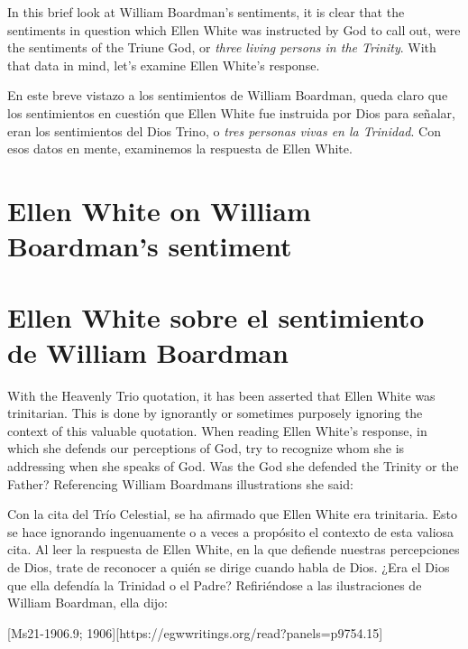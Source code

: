 In this brief look at William Boardman's sentiments, it is clear that the sentiments in question which Ellen White was instructed by God to call out, were the sentiments of the Triune God, or \textit{three living persons in the Trinity}. With that data in mind, let's examine Ellen White's response.


En este breve vistazo a los sentimientos de William Boardman, queda claro que los sentimientos en cuestión que Ellen White fue instruida por Dios para señalar, eran los sentimientos del Dios Trino, o \textit{tres personas vivas en la Trinidad}. Con esos datos en mente, examinemos la respuesta de Ellen White.


\section*{Ellen White on William Boardman’s sentiment}


\section*{Ellen White sobre el sentimiento de William Boardman}


With the Heavenly Trio quotation, it has been asserted that Ellen White was trinitarian. This is done by ignorantly or sometimes purposely ignoring the context of this valuable quotation. When reading Ellen White’s response, in which she defends our perceptions of God, try to recognize whom she is addressing when she speaks of God. Was the God she defended the Trinity or the Father? Referencing William Boardmans illustrations she said:


Con la cita del Trío Celestial, se ha afirmado que Ellen White era trinitaria. Esto se hace ignorando ingenuamente o a veces a propósito el contexto de esta valiosa cita. Al leer la respuesta de Ellen White, en la que defiende nuestras percepciones de Dios, trate de reconocer a quién se dirige cuando habla de Dios. ¿Era el Dios que ella defendía la Trinidad o el Padre? Refiriéndose a las ilustraciones de William Boardman, ella dijo:


[Ms21-1906.9; 1906][https://egwwritings.org/read?panels=p9754.15]



